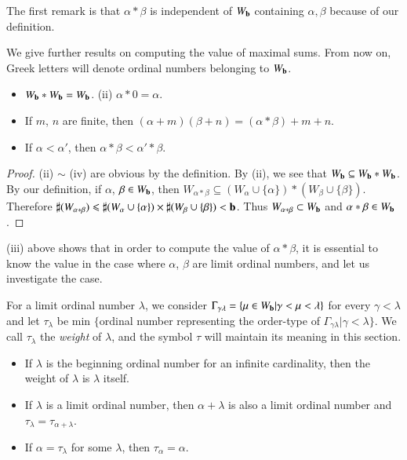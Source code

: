 The first remark is that $\alpha * \beta$ is independent of $W_{\mathbf{b}}$ containing $\alpha, \beta$ because of our definition.

We give further results on computing the value of maximal sums. From now on, Greek letters will denote ordinal numbers belonging to $W_{\mathbf{b}}$.

\begin{proposition}\label{art16-prop3.1}
\begin{itemize}
\item[(i)] $W_{\mathbf{b}} * W_{\mathbf{b}} = W_{\mathbf{b}}$. \quad (ii) $\alpha * 0 = \alpha$.

\item[(iii)] If $m$, $n$ are finite, then $(\alpha + m) (\beta +n) =(\alpha * \beta) + m + n$.

\item[(iv)] If $\alpha < \alpha'$, then $\alpha * \beta < \alpha' * \beta$.
\end{itemize}
\end{proposition}

\begin{proof}
(ii) $\sim$  (iv) are obvious by the definition. By (ii), we see that $W_{\mathbf{b}} \subseteq W_{\mathbf{b}} * W_{\mathbf{b}}$. By our definition, if $\alpha$, $\beta \in W_{\mathbf{b}}$, then $W_{\alpha * \beta} \subseteq (W_\alpha \cup \{\alpha\}) * (W_\beta \cup \{\beta\})$. Therefore $\sharp (W_{\alpha * \beta})\leqslant \sharp (W_\alpha \cup \{\alpha\}) \times \sharp (W_\beta \cup \{\beta\}) < \mathbf{b}$. Thus $W_{\alpha * \beta} \subset W_{\mathbf{b}}$ and $\alpha * \beta \in W_{\mathbf{b}}$.
\end{proof}

(iii) above shows that in order to compute the value of $\alpha * \beta$, it is essential to know the value in the case where $\alpha$, $\beta$ are limit ordinal numbers, and let us investigate the case.

For a limit ordinal number $\lambda$, we consider $\Gamma_{\gamma \lambda} = \{\mu \in W_{\mathbf{b}} |\gamma < \mu < \lambda\}$ for every $\gamma < \lambda$ and let $\tau_\lambda$ be min $\{$ordinal number representing the order-type of $\Gamma_{\gamma \lambda} | \gamma < \lambda \}$. We call $\tau_\lambda$ the {\em weight} of $\lambda$, and the symbol $\tau$ will maintain its meaning in this section.

\begin{lemma}\label{art16-lem3.2}
\begin{itemize}
\item[(i)] If $\lambda$ is the beginning ordinal number for an infinite cardinality, then the weight of $\lambda$ is $\lambda$ itself. 

\item[(ii)] If $\lambda$ is a limit ordinal number, then $\alpha + \lambda$ is also a limit ordinal number and $\tau_\lambda = \tau_{\alpha+ \lambda}$.

\item[(iii)] If $\alpha = \tau_\lambda$ for some $\lambda$, then $\tau_\alpha = \alpha$.
\end{itemize}
\end{lemma}

